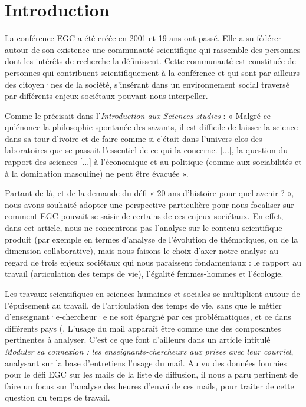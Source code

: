 \documentclass[a4paper,french]{rnti}
\affiliation{
    \affil{1}ATOS\\
          sebastien.valat@atos.net\\
          \http{https://atos.net/fr/}\\
    \affil{2}Université de Lyon, Lyon 2, ERIC EA 3083 (laboratoire 
d'informatique)\\
          cecile.favre@univ-lyon2.fr\\
          \http{https://eric.msh-lse.fr/}\\
    \affil{3}Université de Lyon, Lyon 2, CMW UMR 5283 (laboratoire de 
sociologie)\\
                  \http{https://www.centre-max-weber.fr/}\\
                  
     
          
 }
\begin{document}
\section{Introduction}\label{sec: introduction}

La conférence EGC a été créée en 2001 et 19 ans ont passé. Elle a su 
fédérer autour de son existence une communauté scientifique qui rassemble 
des personnes dont les intérêts de recherche la définissent. Cette 
communauté est constituée de personnes qui contribuent scientifiquement à 
la conférence et qui sont par ailleurs des citoyen·nes de la société, 
s'insérant dans un environnement social traversé par différents enjeux 
sociétaux pouvant nous interpeller.



Comme le précisait \cite{pestre} dans l'\textit{Introduction aux Sciences 
studies} : « Malgré ce qu'énonce la philosophie spontanée des savants, il 
est difficile de laisser la science dans sa tour d'ivoire et de faire 
comme si c'était dans l'univers clos des laboratoires que se passait 
l'essentiel de ce qui la concerne. [...], la question du rapport des 
sciences [...] à l'économique et au politique (comme aux sociabilités et à 
la domination masculine) ne peut être évacuée ».


 Partant de là, et de la demande du défi « 20 ans d’histoire pour quel 
avenir ? », nous avons souhaité adopter une perspective particulière pour 
nous focaliser sur comment EGC pouvait se saisir de certains de ces enjeux 
sociétaux. En effet, dans cet article, nous ne concentrons pas l’analyse 
sur le contenu scientifique produit (par exemple en termes d'analyse de 
l'évolution de thématiques, ou de la dimension collaborative), mais nous 
faisons le choix d’axer notre analyse au regard de trois enjeux sociétaux 
qui nous paraissent fondamentaux : le rapport au travail (articulation des 
temps de vie), l’égalité femmes-hommes et l’écologie.

Les travaux scientifiques en sciences humaines et sociales se multiplient 
autour de l'épuisement au travail, de l'articulation des temps de vie, 
sans que le métier d'enseignant·e-chercheur·e ne soit épargné par ces 
problématiques, et ce dans différents pays (\citep{souffrance-ec-bresil15, 
souffrance-ec-tunisie18}. L'usage du mail apparaît être comme une des 
composantes pertinentes à analyser. C'est ce que font d'ailleurs 
\cite{mail-ec14} dans un article intitulé \textit{Moduler sa connexion : 
les enseignants-chercheurs aux prises avec leur courriel}, analysant sur 
la base d'entretiens l'usage du mail. Au vu des données fournies pour le 
défi EGC sur les mails de la liste de diffusion, il nous a paru pertinent 
de faire un focus sur l’analyse des heures d’envoi de ces mails, pour 
traiter de cette question du temps de travail.
\end{document}
